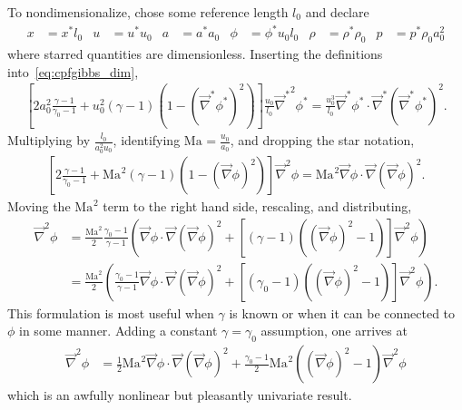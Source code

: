 \documentclass[letterpaper,11pt,nointlimits,reqno]{amsart}
\newcommand{\Mach}[1][]{\ensuremath{\mbox{Ma}_{#1}}}
\begin{document}
To nondimensionalize, chose some reference length $l_0$ and declare
\begin{align}
    x     &= x^\ast l_0
&   u     &= u^\ast u_0
&   a     &= a^\ast a_0
&   \phi  &= \phi^\ast u_0 l_0
&   \rho  &= \rho^\ast \rho_0
&   p     &= p^\ast \rho_0 a_0^2
\label{eq:nondimensionalization}
\end{align}
where starred quantities are dimensionless.  Inserting the definitions
into~\eqref{eq:cpfgibbs_dim},
\begin{align}
    \left[
          2a_0^2 \frac{\gamma-1}{\gamma_0-1}
        + u_0^2 \left(\gamma-1\right)
          \left(1 - \left(\vec{\nabla}^\ast\phi^\ast\right)^2\right)
    \right] \frac{u_0}{l_0} {\vec{\nabla}^\ast}^2\phi^\ast
     =       \frac{u_0^3}{l_0} \vec{\nabla}^\ast\phi^\ast
       \cdot \vec{\nabla}^\ast\left(\vec{\nabla}^\ast\phi^\ast\right)^2
.
\end{align}
Multiplying by $\frac{l_0}{a_0^2 u_0}$, identifying $\Mach =
\frac{u_0}{a_0}$, and dropping the star notation,
\begin{align}
    \left[
          2 \frac{\gamma-1}{\gamma_0-1}
        + \Mach^2 \left(\gamma-1\right)
          \left(1 - \left(\vec{\nabla}\phi\right)^2\right)
    \right] {\vec{\nabla}}^2\phi
     =       \Mach^2 \vec{\nabla}\phi
       \cdot \vec{\nabla}\left(\vec{\nabla}\phi\right)^2
.
\end{align}
Moving the $\Mach^2$ term to the right hand side, rescaling, and distributing,
\begin{align}
       {\vec{\nabla}}^2\phi
    &= \frac{\Mach^2}{2}\frac{\gamma_0-1}{\gamma-1} \left(
         \vec{\nabla}\phi \cdot \vec{\nabla}\left(\vec{\nabla}\phi\right)^2
       +
       \left[
             \left(\gamma-1\right)
             \left(\left(\vec{\nabla}\phi\right)^2 - 1\right)
       \right] {\vec{\nabla}}^2\phi
       \right)
\\  &= \frac{\Mach^2}{2} \left(
         \frac{\gamma_0-1}{\gamma-1}
         \vec{\nabla}\phi \cdot \vec{\nabla}\left(\vec{\nabla}\phi\right)^2
       +
       \left[
             \left(\gamma_0-1\right)
             \left(\left(\vec{\nabla}\phi\right)^2 - 1\right)
       \right] {\vec{\nabla}}^2\phi
       \right)
.
\end{align}
This formulation is most useful when $\gamma$ is known or when it can be
connected to $\phi$ in some manner.  Adding a constant $\gamma=\gamma_0$
assumption, one arrives at
\begin{align}
       {\vec{\nabla}}^2\phi
    &=   \frac{1}{2}\Mach^2
         \vec{\nabla}\phi \cdot \vec{\nabla}\left(\vec{\nabla}\phi\right)^2
       +
         \frac{\gamma_0-1}{2}\Mach^2
         \left(\left(\vec{\nabla}\phi\right)^2 - 1\right)
         {\vec{\nabla}}^2\phi
\label{eq:cpfgibbs_nondim}
\end{align}
which is an awfully nonlinear but pleasantly univariate result.
\end{document}
